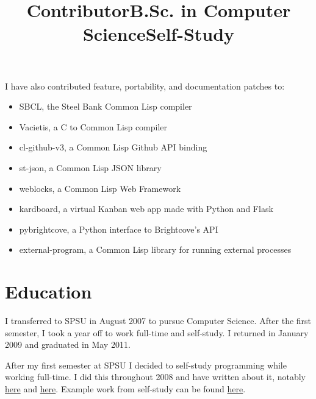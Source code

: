 \documentclass[margintitle,line]{res}
\begin{document}
\begin{resume}
\pagebreak

\title{Contributor}
\begin{position}
  I have also contributed feature, portability, and documentation patches to:
  \begin{itemize}
    \item{SBCL, the Steel Bank Common Lisp compiler}
    \item{Vacietis, a C to Common Lisp compiler}
    \item{cl-github-v3, a Common Lisp Github API binding}
    \item{st-json, a Common Lisp JSON library}
    \item{weblocks, a Common Lisp Web Framework}
    \item{kardboard, a virtual Kanban web app made with Python and Flask}
    \item{pybrightcove, a Python interface to Brightcove's API}
    \item{external-program, a Common Lisp library for running external processes}
  \end{itemize}
\end{position}


\section{Education}

\title{B.Sc. in Computer Science}
\begin{position}
  I transferred to SPSU in August 2007 to pursue Computer Science.
  After the first semester, I took a year off to work full-time and self-study.
  I returned in January 2009 and graduated in May 2011.
\end{position}

\title{Self-Study}
\begin{position}
  After my first semester at SPSU I decided to self-study
  programming while working full-time. I did this
  throughout 2008 and have written about it, notably
  \href{http://blog.redlinernotes.com/posts/Leaving-College-to-Leverage-Compulsion.html}{here} and
  \href{http://blog.redlinernotes.com/posts/Spring-2008-Schedule-and-Syllabus.html}{here}.
  Example work from self-study can be found
  \href{http://blog.redlinernotes.com/posts/SICP-Section-13.html}{here}.
\end{position}


\end{resume}
\end{document}
